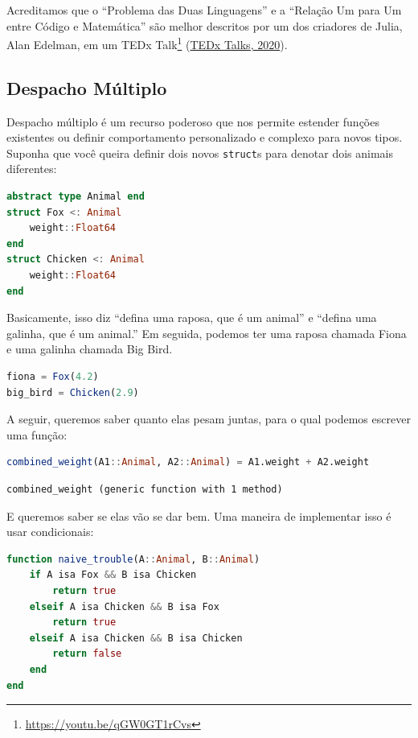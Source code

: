 \documentclass[
  notoc %
]{tufte-book}
\DeclareRobustCommand{\href}[2]{#2\footnote{\url{#1}}}
\newcommand{\passthrough}[1]{#1}
\begin{document}
Acreditamos que o ``Problema das Duas Linguagens'' e a ``Relação Um para
Um entre Código e Matemática'' são melhor descritos por um dos criadores
de Julia, Alan Edelman, em um \href{https://youtu.be/qGW0GT1rCvs}{TEDx
Talk} (\protect\hyperlink{ref-tedxtalksProgrammingLanguageHeal2020}{TEDx
Talks, 2020}).

\hypertarget{sec:multiple_dispatch}{%
\subsection{Despacho Múltiplo}\label{sec:multiple_dispatch}}

Despacho múltiplo é um recurso poderoso que nos permite estender funções
existentes ou definir comportamento personalizado e complexo para novos
tipos. Suponha que você queira definir dois novos
\passthrough{\lstinline!struct!}s para denotar dois animais diferentes:

\begin{lstlisting}[language=Julia]
abstract type Animal end
struct Fox <: Animal
    weight::Float64
end
struct Chicken <: Animal
    weight::Float64
end
\end{lstlisting}

Basicamente, isso diz ``defina uma raposa, que é um animal'' e ``defina
uma galinha, que é um animal.'' Em seguida, podemos ter uma raposa
chamada Fiona e uma galinha chamada Big Bird.

\begin{lstlisting}[language=Julia]
fiona = Fox(4.2)
big_bird = Chicken(2.9)
\end{lstlisting}

A seguir, queremos saber quanto elas pesam juntas, para o qual podemos
escrever uma função:

\begin{lstlisting}[language=Julia]
combined_weight(A1::Animal, A2::Animal) = A1.weight + A2.weight
\end{lstlisting}

\begin{lstlisting}[language=Output]
combined_weight (generic function with 1 method)
\end{lstlisting}

E queremos saber se elas vão se dar bem. Uma maneira de implementar isso
é usar condicionais:

\begin{lstlisting}[language=Julia]
function naive_trouble(A::Animal, B::Animal)
    if A isa Fox && B isa Chicken
        return true
    elseif A isa Chicken && B isa Fox
        return true
    elseif A isa Chicken && B isa Chicken
        return false
    end
end
\end{lstlisting}
\end{document}
